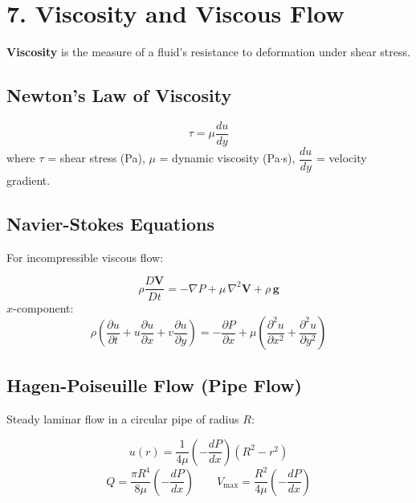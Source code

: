 \documentclass[12pt]{article}
\begin{document}
\section{7. Viscosity and Viscous Flow}

\begin{defbox}[Viscosity]
\textbf{Viscosity} is the measure of a fluid's resistance to deformation under shear stress.
\end{defbox}

\subsection{Newton's Law of Viscosity}

\begin{formulabox}
\[
  \tau = \mu \frac{du}{dy}
\]
where $\tau$ = shear stress (Pa), $\mu$ = dynamic viscosity (Pa$\cdot$s), $\dfrac{du}{dy}$ = velocity gradient.
\end{formulabox}

\subsection{Navier-Stokes Equations}

For incompressible viscous flow:

\begin{formulabox}
\[
  \rho\frac{D\mathbf{V}}{Dt} = -\nabla P + \mu\,\nabla^2\mathbf{V} + \rho\,\mathbf{g}
\]
$x$-component:
\[
  \rho\!\left(\frac{\partial u}{\partial t} + u\frac{\partial u}{\partial x} + v\frac{\partial u}{\partial y}\right)
  = -\frac{\partial P}{\partial x} + \mu\!\left(\frac{\partial^2 u}{\partial x^2}+\frac{\partial^2 u}{\partial y^2}\right)
\]
\end{formulabox}

\subsection{Hagen-Poiseuille Flow (Pipe Flow)}

Steady laminar flow in a circular pipe of radius $R$:

\begin{formulabox}
\[
  u(r) = \frac{1}{4\mu}\!\left(-\frac{dP}{dx}\right)(R^2 - r^2)
\]
\[
  Q = \frac{\pi R^4}{8\mu}\!\left(-\frac{dP}{dx}\right) \qquad
  V_{\max} = \frac{R^2}{4\mu}\!\left(-\frac{dP}{dx}\right)
\]
\end{formulabox}
\end{document}

